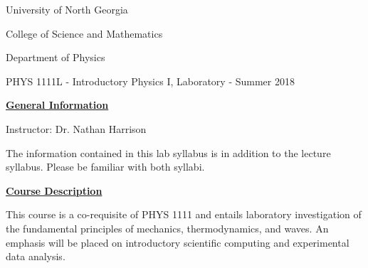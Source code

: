 \documentclass[12pt]{article}
\begin{document}
{\centering
\large University of North Georgia \par
\large College of Science and Mathematics \par
\large Department of Physics \par
\large PHYS 1111L - Introductory Physics I, Laboratory - Summer 2018 \par
}
\hfill \break \vspace{-4mm}

\underline{\textbf{General Information}} \par
Instructor: Dr. Nathan Harrison \par
The information contained in this lab syllabus is in addition to the lecture syllabus. Please be familiar with both syllabi.
\hfill \break

\underline{\textbf{Course Description}} \par
This course is a co-requisite of PHYS 1111 and entails laboratory investigation of the fundamental principles of mechanics, thermodynamics, and waves.
An emphasis will be placed on introductory scientific computing and experimental data analysis.
\end{document}
